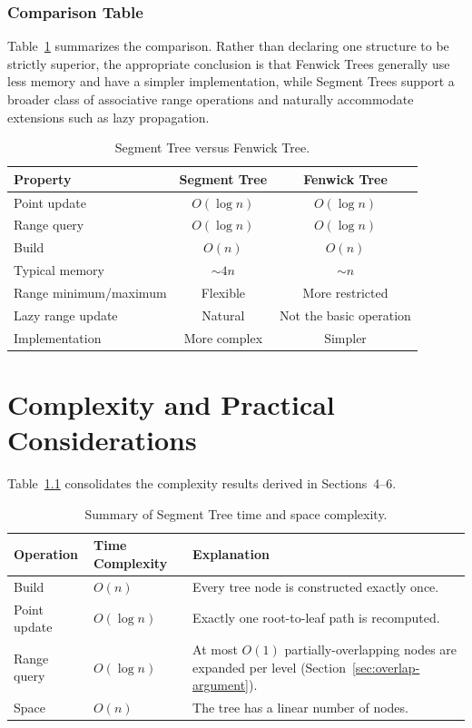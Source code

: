 \documentclass[11pt,open=any,headings=option]{scrreprt}
\begin{document}
\subsection{Comparison Table}
Table~\ref{tab:comparison} summarizes the comparison. Rather than declaring one structure to be strictly superior, the appropriate conclusion is that Fenwick Trees generally use less memory and have a simpler implementation, while Segment Trees support a broader class of associative range operations and naturally accommodate extensions such as lazy propagation.

\begin{table}[h]
\centering
\caption{Segment Tree versus Fenwick Tree.}
\label{tab:comparison}
\begin{tabular}{lcc}
\toprule
\textbf{Property} & \textbf{Segment Tree} & \textbf{Fenwick Tree} \\
\midrule
Point update            & $O(\log n)$ & $O(\log n)$ \\
Range query              & $O(\log n)$ & $O(\log n)$ \\
Build                    & $O(n)$      & $O(n)$ \\
Typical memory           & $\sim 4n$   & $\sim n$ \\
Range minimum/maximum    & Flexible    & More restricted \\
Lazy range update        & Natural     & Not the basic operation \\
Implementation           & More complex& Simpler \\
\bottomrule
\end{tabular}
\end{table}

\chapter{Complexity and Practical Considerations}

Table~\ref{tab:summary} consolidates the complexity results derived in Sections~4--6.

\begin{table}[h]
\centering
\caption{Summary of Segment Tree time and space complexity.}
\label{tab:summary}
\begin{tabular}{llp{6.5cm}}
\toprule
\textbf{Operation} & \textbf{Time Complexity} & \textbf{Explanation} \\
\midrule
Build         & $O(n)$      & Every tree node is constructed exactly once. \\
Point update  & $O(\log n)$ & Exactly one root-to-leaf path is recomputed. \\
Range query   & $O(\log n)$ & At most $O(1)$ partially-overlapping nodes are expanded per level (Section~\ref{sec:overlap-argument}). \\
Space         & $O(n)$      & The tree has a linear number of nodes. \\
\bottomrule
\end{tabular}
\end{table}
\end{document}
